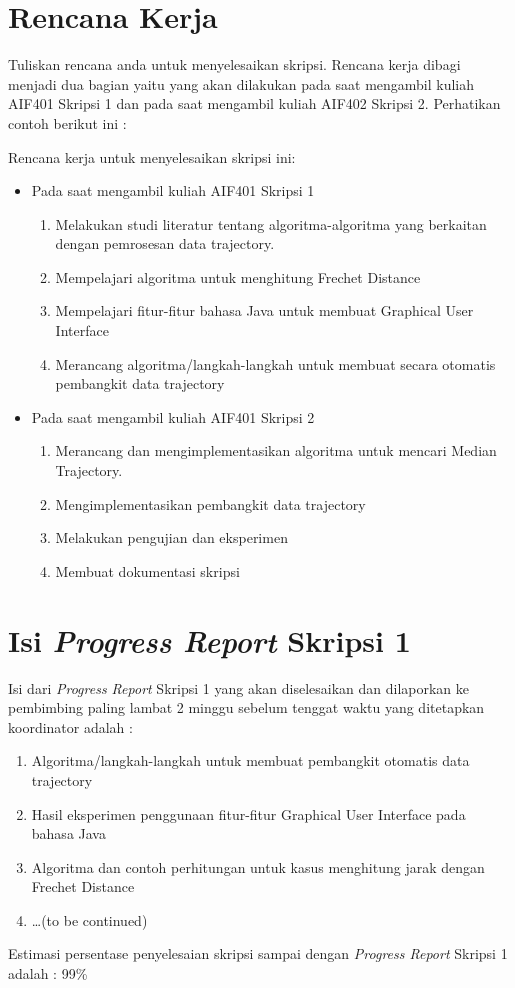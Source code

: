 \documentclass[a4paper,twoside]{article}
\begin{document}
\section{Rencana Kerja}
Tuliskan rencana anda untuk menyelesaikan skripsi. Rencana kerja dibagi menjadi dua bagian yaitu yang akan dilakukan pada saat mengambil kuliah AIF401 Skripsi 1 dan pada saat mengambil kuliah AIF402 Skripsi 2. Perhatikan contoh berikut ini :

Rencana kerja untuk menyelesaikan skripsi ini:
\begin{itemize}
	\item Pada saat mengambil kuliah AIF401 Skripsi 1
	\begin{enumerate}
		\item Melakukan studi literatur tentang algoritma-algoritma yang berkaitan dengan pemrosesan data trajectory.
		\item Mempelajari algoritma untuk menghitung Frechet Distance
		\item Mempelajari fitur-fitur bahasa Java untuk membuat Graphical User Interface
		\item Merancang algoritma/langkah-langkah untuk membuat secara otomatis pembangkit data trajectory
	\end{enumerate}
	\item Pada saat mengambil kuliah AIF401 Skripsi 2
	\begin{enumerate}
		\item Merancang dan mengimplementasikan algoritma untuk mencari Median Trajectory.
		\item Mengimplementasikan pembangkit data trajectory 
		\item Melakukan pengujian dan eksperimen
		\item Membuat dokumentasi skripsi
	\end{enumerate}
\end{itemize}

\section{Isi {\it Progress Report} Skripsi 1}
Isi dari {\it Progress Report} Skripsi 1 yang akan diselesaikan dan dilaporkan ke pembimbing paling lambat 2 minggu sebelum tenggat waktu yang ditetapkan koordinator adalah :
\begin{enumerate}
	\item Algoritma/langkah-langkah untuk membuat pembangkit otomatis data trajectory
	\item Hasil eksperimen penggunaan fitur-fitur Graphical User Interface pada bahasa Java
	\item Algoritma dan contoh perhitungan untuk kasus menghitung jarak dengan Frechet Distance
	\item \ldots (to be continued)
\end{enumerate}
Estimasi persentase penyelesaian skripsi sampai dengan {\it Progress Report} Skripsi 1 adalah : 99\%
\end{document}
